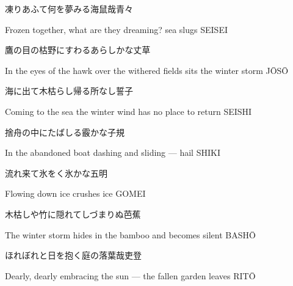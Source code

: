 \begin{haiku}
    {\FH 凍りあふて何を夢みる海鼠哉}\hfill{\FH 青々}

    \vin{} Frozen together,
    \vin{} \vin{} what are they dreaming?
    \vin{} \vin{} \vin{} sea slugs \hspace{\fill} SEISEI
\end{haiku}

\begin{haiku}
    {\FH 鷹の目の枯野にすわるあらしかな}\hfill{\FH 丈草}

    \vin{} In the eyes of the hawk
    \vin{} \vin{} over the withered fields
    \vin{} \vin{} \vin{} sits the winter storm \hspace{\fill} J\={O}S\={O}
\end{haiku}

\begin{haiku}
    {\FH 海に出て木枯らし帰る所なし}\hfill{\FH 誓子}

    \vin{} Coming to the sea
    \vin{} \vin{} the winter wind has no place
    \vin{} \vin{} \vin{} to return \hspace{\fill} SEISHI
\end{haiku}

\begin{haiku}
    {\FH 捨舟の中にたばしる霰かな}\hfill{\FH 子規}

    \vin{} In the abandoned boat
    \vin{} \vin{} dashing and sliding ---
    \vin{} \vin{} \vin{} hail \hspace{\fill} SHIKI
\end{haiku}

\begin{haiku}
    {\FH 流れ来て氷をく氷かな}\hfill{\FH 五明}

    \vin{} Flowing down
    \vin{} \vin{} ice crushes
    \vin{} \vin{} \vin{} ice \hspace{\fill} GOMEI
\end{haiku}

\begin{haiku}
    {\FH 木枯しや竹に隠れてしづまりぬ}\hfill{\FH 芭蕉}

    \vin{} The winter storm
    \vin{} \vin{} hides in the bamboo
    \vin{} \vin{} \vin{} and becomes silent \hspace{\fill} BASH\={O}
\end{haiku}

\begin{haiku}
    {\FH ほれぼれと日を抱く庭の落葉哉}\hfill{\FH 吏登}

    \vin{} Dearly, dearly
    \vin{} \vin{} embracing the sun ---
    \vin{} \vin{} \vin{} the fallen garden leaves \hspace{\fill} RIT\={O}
\end{haiku}

